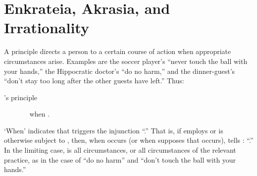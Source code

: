 \documentclass[11pt,letterpaper,oneside]{amsart}
\begin{document}




\section{Enkrateia, Akrasia, and Irrationality}

A principle directs a person to a certain course of action when appropriate circumstances arise. Examples are the soccer player's ``never touch the ball with your hands,'' the Hippocratic doctor's ``do no harm,'' and the dinner-guest's ``don't stay too long after the other guests have left.'' Thus:\begin{description}\item['s principle ] \  when .\end{description} `When' indicates that  triggers the injunction ``.'' That is, if  employs or is otherwise subject to , then, when  occurs (or when  supposes that  occurs),  tells : ``.'' In the limiting case,  is all circumstances, or all circumstances of the relevant practice, as in the case of ``do no harm'' and ``don't touch the ball with your hands.''







\end{document}
